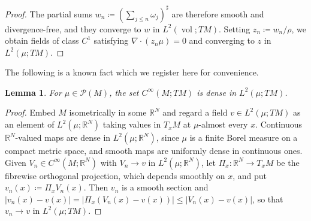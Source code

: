 \documentclass[11pt,reqno]{amsart}
\theoremstyle{plain}
\newtheorem{lem}[thm]{Lemma}
\theoremstyle{definition}
\newcommand{\R}{\mathbb{R}}
\newcommand{\Prob}{\mathcal{P}}
\DeclareMathOperator{\vol}{vol}
\begin{document}
\begin{proof}
    The partial sums \( w_n\coloneqq\left(\sum_{j\leq n}\omega_j\right)^\sharp\) are therefore smooth and divergence-free, and they converge to \( w \) in \( L^2(\vol;TM) \).
    Setting \( z_n\coloneqq w_n/\rho \), we obtain fields of class \( C^1 \) satisfying \( \nabla\!\cdot(z_n\mu)=0 \) and converging to \( z \) in \( L^2(\mu;TM) \).
\end{proof}

The following is a known fact which we register here for convenience. 
\begin{lem}
\label{lem:smooth.dense}
    For \( \mu\in\Prob(M) \), the set \( C^\infty(M;TM) \) is dense in \( L^2(\mu;TM) \).
\end{lem}

\begin{proof}
    Embed \( M \) isometrically in some \( \R^N \) and regard a field \( v\in L^2(\mu;TM) \) as an element of \( L^2(\mu;\R^N) \) taking values in \( T_xM \) at \( \mu \)-almost every \( x \).
    Continuous \( \R^N \)-valued maps are dense in \( L^2(\mu;\R^N) \), since \( \mu \) is a finite Borel measure on a compact metric space, and smooth maps are uniformly dense in continuous ones.
    Given \( V_n\in C^\infty(M;\R^N) \) with \( V_n\to v \) in \( L^2(\mu;\R^N) \), let \( \Pi_x:\R^N\to T_xM \) be the fibrewise orthogonal projection, which depends smoothly on \( x \), and put \( v_n(x)\coloneqq\Pi_xV_n(x) \).
    Then \( v_n \) is a smooth section and \( \lvert v_n(x)-v(x)\rvert=\lvert\Pi_x\left(V_n(x)-v(x)\right)\rvert\le\lvert V_n(x)-v(x)\rvert \), so that \( v_n\to v \) in \( L^2(\mu;TM) \).
\end{proof}
\end{document}
